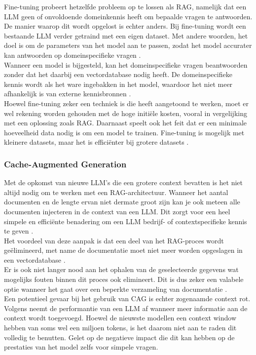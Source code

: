 Fine-tuning probeert hetzelfde probleem op te lossen als RAG, namelijk dat een LLM geen of onvoldoende domeinkennis heeft om bepaalde vragen te antwoorden. De manier waarop dit wordt opgelost is echter anders. Bij fine-tuning wordt een bestaande LLM verder getraind met een eigen dataset. Met andere woorden, het doel is om de parameters van het model aan te passen, zodat het model accurater kan antwoorden op domeinspecifieke vragen \autocite{Raj2024}.
\\[1em]
Wanneer een model is bijgesteld, kan het domeinspecifieke vragen beantwoorden zonder dat het daarbij een vectordatabase nodig heeft. De domeinspecifieke kennis wordt als het ware ingebakken in het model, waardoor het niet meer afhankelijk is van externe kennisbronnen \autocite{Raj2024}.
\\[1em]
Hoewel fine-tuning zeker een techniek is die heeft aangetoond te werken, moet er wel rekening worden gehouden met de hoge initiële kosten, vooral in vergelijking met een oplossing zoals RAG. Daarnaast speelt ook het feit dat er een minimale hoeveelheid data nodig is om een model te trainen. Fine-tuning is mogelijk met kleinere datasets, maar het is efficiënter bij grotere datasets \autocite{Balaguer2024}.

\subsubsection{Cache-Augmented Generation}

Met de opkomst van nieuwe LLM's die een grotere context bevatten is het niet altijd nodig om te werken met een RAG-architectuur. Wanneer het aantal documenten en de lengte ervan niet dermate groot zijn kan je ook meteen alle documenten injecteren in de context van een LLM. Dit zorgt voor een heel simpele en efficiënte benadering om een LLM bedrijf- of contextspecifieke kennis te geven \autocite{Chan2025}.
\\[1em]
Het voordeel van deze aanpak is dat een deel van het RAG-proces wordt geëlimineerd, met name de documentatie moet niet meer worden opgeslagen in een vectordatabase \autocite{Chan2025}. 
\\[1em]
Er is ook niet langer nood aan het ophalen van de geselecteerde gegevens wat mogelijks fouten binnen dit proces ook elimineert. Dit is dus zeker een valabele optie wanneer het gaat over een beperkte verzameling van documentatie \autocite{Chan2025}. 
\\[1em]
Een potentieel gevaar bij het gebruik van CAG is echter zogenaamde context rot. Volgens \textcite{hong2025context} neemt de performantie van een LLM af wanneer meer informatie aan de context wordt toegevoegd. Hoewel de nieuwste modellen een context window hebben van soms wel een miljoen tokens, is het daarom niet aan te raden dit volledig te benutten. Gelet op de negatieve impact die dit kan hebben op de prestaties van het model zelfs voor simpele vragen.

